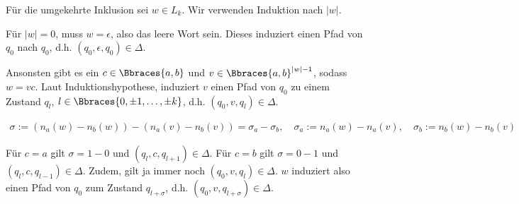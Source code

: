 \begin{solution}
Für die umgekehrte Inklusion sei $w \in L_k$.
Wir verwenden Induktion nach $|w|$.

Für $|w| = 0$, muss $w = \epsilon$, also das leere Wort sein.
Dieses induziert einen Pfad von $q_0$ nach $q_0$, d.h. $(q_0, \epsilon, q_0) \in \Delta$.

Ansonsten gibt es ein $c \in \Bbraces{a, b}$ und $v \in \Bbraces{a, b}^{|w| - 1}$, sodass $w = v c$.
Laut Induktionshypothese, induziert $v$ einen Pfad von $q_0$ zu einem Zustand $q_l$, $l \in \Bbraces{0, \pm 1, \dots, \pm k}$, d.h. $(q_0, v, q_l) \in \Delta$.

\begin{align*}
    \sigma := (n_a(w) - n_b(w)) - (n_a(v) - n_b(v)) = \sigma_a - \sigma_b,
    \quad
    \sigma_a := n_a(w) - n_a(v),
    \quad
    \sigma_b := n_b(w) - n_b(v)
\end{align*}

Für $c = a$ gilt $\sigma = 1 - 0$ und $(q_l, c, q_{l + 1}) \in \Delta$.
Für $c = b$ gilt $\sigma = 0 - 1$ und $(q_l, c, q_{l - 1}) \in \Delta$.
Zudem, gilt ja immer noch $(q_0, v, q_l) \in \Delta$.
$w$ induziert also einen Pfad von $q_0$ zum Zustand $q_{l + \sigma}$, d.h. $(q_0, v, q_{l + \sigma}) \in \Delta$.

\end{solution}

